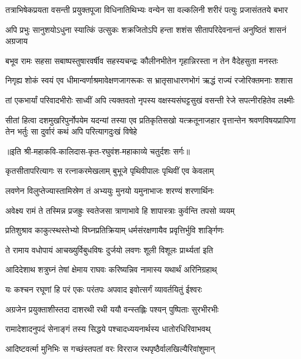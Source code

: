 \twolineshloka
{तत्राभिषेकप्रयता वसन्ती प्रयुक्तपूजा विधिनातिथिभ्यः}
{वन्येन सा वल्कलिनी शरीरं पत्युः प्रजासंततये बभार}%

\twolineshloka
{अपि प्रभुः सानुशयोऽधुना स्यात्किं उत्सुकः शक्रजितोऽपि हन्ता}
{शशंस सीतापरिदेवनान्तं अनुष्ठितं शासनं अग्रजाय}%

\twolineshloka
{बभूव रामः सहसा सबाष्पस्तुषारवर्षीव सहस्यचन्द्रः}
{कौलीनभीतेन गृहान्निरस्ता न तेन वैदेहसुता मनस्तः}%

\twolineshloka
{निगृह्य शोकं स्वयं एव धीमान्वर्णाश्रमावेक्षणजागरूकः}
{स भ्रातृसाधारणभोगं ऋद्धं राज्यं रजोरिक्तमनाः शशास}%

\twolineshloka
{तां एकभार्यां परिवादभीरोः साध्वीं अपि त्यक्तवतो नृपस्य}
{वक्षस्यसंघट्टसुखं वसन्ती रेजे सपत्नीरहितेव लक्ष्मीः}%

\twolineshloka
{सीतां हित्वा दशमुखरिपुर्नोपयेम यदन्यां तस्या एव प्रतिकृतिसखो यत्क्रतूनाजहार}
{वृत्तान्तेन श्रवणविषयप्रापिणा तेन भर्तुः सा दुर्वारं कथं अपि परित्यागदुःखं विषेहे}%

॥इति श्री-महाकवि-कालिदास-कृत-रघुवंश-महाकाव्ये चतुर्दशः सर्गः॥


\twolineshloka
{कृतसीतापरित्यागः स रत्नाकरमेखलाम्}
{बुभूजे पृथिवीपालः पृथिवीं एव केवलाम्}%

\twolineshloka
{लवणेन विलुप्तेज्यास्तामिस्रेण तं अभ्ययुः}
{मुनयो यमुनाभाजः शरण्यं शरणार्थिनः}%

\twolineshloka
{अवेक्ष्य रामं ते तस्मिन्न प्रजह्रुः स्वतेजसा}
{त्राणाभावे हि शापास्त्राः कुर्वन्ति तपसो व्ययम्}%

\twolineshloka
{प्रतिशुश्राव काकुत्स्थस्तेभ्यो विघ्नप्रतिक्रियाम्}
{धर्मसंरक्षणायैव प्रवृत्तिर्भुवि शार्ङ्गिणः}%

\twolineshloka
{ते रामाय वधोपायं आचख्युर्विबुधविषः}
{दुर्जयो लवणः शूली विशूलः प्रार्थ्यतां इति}%

\twolineshloka
{आदिदेशाथ शत्रुघ्नं तेषां क्षेमाय राघवः}
{करिष्यन्निव नामास्य यथार्थं अरिनिग्रहाथ्}%

\twolineshloka
{यः कश्चन रघूणां हि परं एकः परंतपः}
{अपवाद इवोत्सर्गं व्यावर्तयितुं ईश्वरः}%

\twolineshloka
{अग्रजेन प्रयुक्ताशीस्तदा दाशरथी रथी}
{ययौ वन्स्तह्लिः पश्यन् पुष्पिताः सुरभीरभीः}%

\twolineshloka
{रामादेशादनुपदं सेनाङ्गं तस्य सिद्धये}
{पश्चादध्ययनार्थस्य धातोरधिरिवाभवथ्}%

\twolineshloka
{आदिष्टवर्त्मा मुनिभिः स गच्छंस्तपतां वरः}
{विरराज रथपृष्ठैर्वालखिल्यैरिवांशुमान्}%

